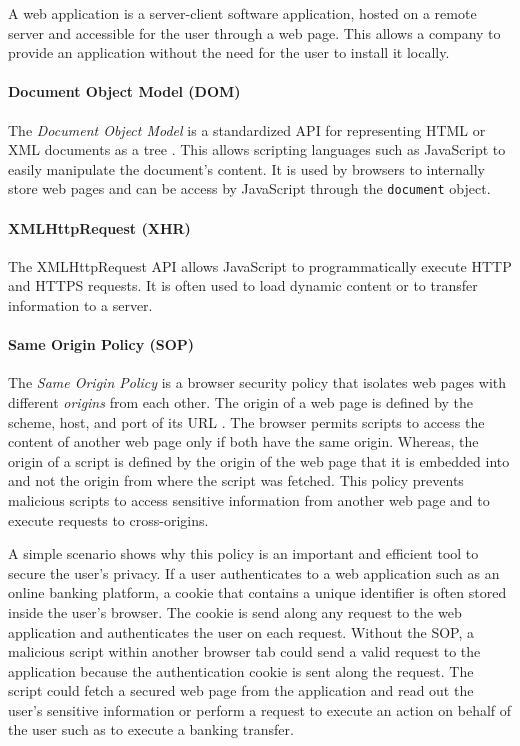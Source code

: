 	A web application is a server-client software application, hosted on a remote server and accessible for the user through a web page. This allows a company to provide an application without the need for the user to install it locally.

\paragraph{Document Object Model (DOM)}

	The \textit{Document Object Model} is a standardized API for representing HTML or XML documents as a tree \cite{w3cDOMSpecification}. This allows scripting languages such as JavaScript to easily manipulate the document's content. It is used by browsers to internally store web pages and can be access by JavaScript through the \texttt{document} object. 

\paragraph{XMLHttpRequest (XHR)}

	The XMLHttpRequest API allows JavaScript to programmatically execute HTTP and HTTPS requests. It is often used to load dynamic content or to transfer information to a server. 

\paragraph{Same Origin Policy (SOP)}
	
	The \textit{Same Origin Policy} is a browser security policy that isolates web pages with different \textit{origins} from each other. The origin of a web page is defined by the scheme, host, and port of its URL \cite{w3cOriginSpecification}. The browser permits scripts to access the content of another web page only if both have the same origin. Whereas, the origin of a script is defined by the origin of the web page that it is embedded into and not the origin from where the script was fetched. This policy prevents malicious scripts to access sensitive information from another web page and to execute requests to cross-origins. 
	
	A simple scenario shows why this policy is an important and efficient tool to secure the user's privacy. If a user authenticates to a web application such as an online banking platform, a cookie that contains a unique identifier is often stored inside the user's browser. The cookie is send along any request to the web application and authenticates the user on each request. Without the SOP, a malicious script within another browser tab could send a valid request to the application because the authentication cookie is sent along the request. The script could fetch a secured web page from the application and read out the user's sensitive information or perform a request to execute an action on behalf of the user such as to execute a banking transfer.  
	
